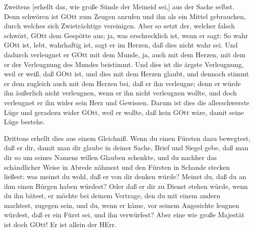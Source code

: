 Zweitens [erhellt das, wie große Sünde der Meineid sei,] aus der Sache selbst. Denn schwören ist GOtt zum Zeugen anrufen und ihn als ein Mittel gebrauchen, durch welches sich Zwieträchtige vereinigen. Aber so setzt der, welcher falsch schwört, GOtt dem Gespötte aus; ja, was erschrecklich ist, wenn er sagt: So wahr GOtt ist, lebt, wahrhaftig ist, sagt er im Herzen, daß dies nicht wahr sei. Und dadurch verleugnet er GOtt mit dem Munde, ja, auch mit dem Herzen, mit dem er der Verleugnung des Mundes beistimmt. Und dies ist die ärgste Verleugnung, weil er weiß, daß GOtt ist, und dies mit dem Herzen glaubt, und dennoch stimmt er dem zugleich auch mit dem Herzen bei, daß er ihn verleugne; denn er würde ihn äußerlich nicht verleugnen, wenn er ihn nicht verleugnen wollte, und doch verleugnet er ihn wider sein Herz und Gewissen. Darum ist dies die allerschwerste Lüge und geradezu wider GOtt, weil er wollte, daß kein GOtt wäre, damit seine Lüge bestehe.

Drittens erhellt dies aus einem Gleichniß. Wenn du einen Fürsten dazu bewegtest, daß er dir, damit man dir glaube in deiner Sache, Brief und Siegel gebe, daß man dir so um seines Namens willen Glauben schenkte, und du nachher das schändlicher Weise in Abrede nähmest und den Fürsten in Schande stecken ließest: was meinst du wohl, daß er von dir denken würde? Meinst du, daß du an ihm einen Bürgen haben würdest? Oder daß er dir zu Dienst stehen würde, wenn du ihn bätest, er möchte bei deinem Vertrage, den du mit einem andern machtest, zugegen sein, und du, wenn er käme, vor seinem Angesichte leugnen würdest, daß er ein Fürst sei, und ihn verwürfest? Aber eine wie große Majestät ist doch GOtt! Er ist allein der HErr.


